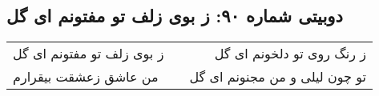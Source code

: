 \begin{center}
\section*{دوبیتی شماره ۹۰: ز بوی زلف تو مفتونم ای گل}
\label{sec:090}
\begin{longtable}{l p{0.5cm} r}
ز بوی زلف تو مفتونم ای گل
&&
ز رنگ روی تو دلخونم ای گل
\\
من عاشق زعشقت بیقرارم
&&
تو چون لیلی و من مجنونم ای گل
\\
\end{longtable}
\end{center}
